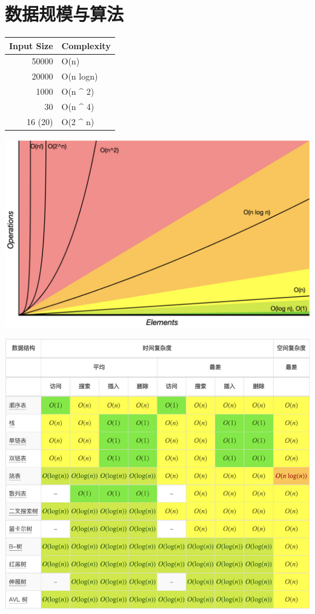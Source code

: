 \documentclass[9pt, b5paaper]{book}
\begin{document}
\section{数据规模与算法}
\label{sec-1-3}
\begin{center}
\begin{tabular}{rl}
\hline
Input Size & Complexity\\
\hline
50000 & O(n)\\
20000 & O(n logn)\\
\hline
1000 & O(n \^{} 2)\\
30 & O(n \^{} 4)\\
16 (20) & O(2 \^{} n)\\
\hline
\end{tabular}
\end{center}


\includegraphics[width=.9\linewidth]{./pic/bigo.jpeg}

\includegraphics[width=.9\linewidth]{./pic/bigo2.jpeg}
\end{document}
